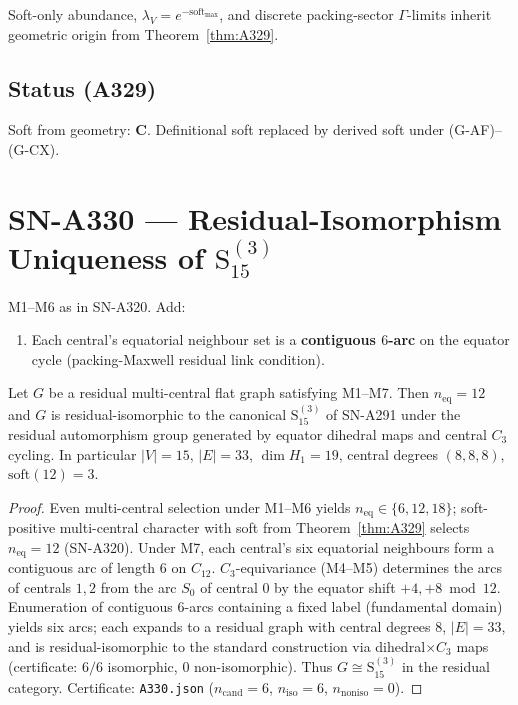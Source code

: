 \begin{corollary}[Inheritance]
\label{cor:A329}
Soft-only abundance, $\lambda_V=e^{-\mathrm{soft}_{\max}}$, and discrete packing-sector $\Gamma$-limits inherit geometric origin from Theorem~\ref{thm:A329}.
\end{corollary}

\subsection*{Status (A329)}
Soft from geometry: \textbf{C}. Definitional soft replaced by derived soft under (G-AF)--(G-CX).

\section{SN-A330 --- Residual-Isomorphism Uniqueness of $\mathrm{S}_{15}^{(3)}$}
\label{sec:SN-A330}

\begin{definition}
\label{def:A330-M}
M1--M6 as in SN-A320. Add:
\begin{enumerate}[label=(M7)]
\item Each central's equatorial neighbour set is a \textbf{contiguous $6$-arc} on the equator cycle (packing-Maxwell residual link condition).
\end{enumerate}
\end{definition}

\begin{theorem}
\label{thm:A330}
Let $G$ be a residual multi-central flat graph satisfying M1--M7.
Then $n_{\mathrm{eq}}=12$ and $G$ is residual-isomorphic to the canonical $\mathrm{S}_{15}^{(3)}$ of SN-A291 under the residual automorphism group generated by equator dihedral maps and central $C_3$ cycling.
In particular $|V|=15$, $|E|=33$, $\dim H_1=19$, central degrees $(8,8,8)$, $\mathrm{soft}(12)=3$.
\end{theorem}

\begin{proof}
Even multi-central selection under M1--M6 yields $n_{\mathrm{eq}}\in\{6,12,18\}$; soft-positive multi-central character with soft from Theorem~\ref{thm:A329} selects $n_{\mathrm{eq}}=12$ (SN-A320).
Under M7, each central's six equatorial neighbours form a contiguous arc of length $6$ on $C_{12}$.
$C_3$-equivariance (M4--M5) determines the arcs of centrals $1,2$ from the arc $S_0$ of central $0$ by the equator shift $+4,+8\bmod 12$.
Enumeration of contiguous $6$-arcs containing a fixed label (fundamental domain) yields six arcs; each expands to a residual graph with central degrees $8$, $|E|=33$, and is residual-isomorphic to the standard construction via dihedral$\times C_3$ maps (certificate: $6/6$ isomorphic, $0$ non-isomorphic).
Thus $G\cong \mathrm{S}_{15}^{(3)}$ in the residual category.
Certificate: \texttt{A330.json} ($n_{\mathrm{cand}}=6$, $n_{\mathrm{iso}}=6$, $n_{\mathrm{noniso}}=0$).
\end{proof}

